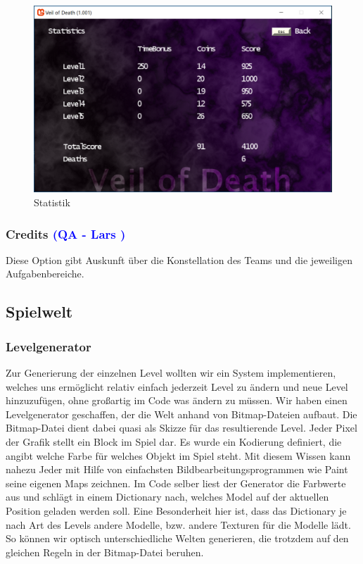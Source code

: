 \documentclass[12pt]{article}
\begin{document}
\begin{figure}
	\centering
	\includegraphics[width=1\textwidth]{Statistics}
	\caption{Statistik
		\label{fig:statistics}}
\end{figure}

\vspace{1cm}
\subsubsection{Credits \textcolor{blue}{(QA - Lars )}}

Diese Option gibt Auskunft über die Konstellation des Teams und die jeweiligen Aufgabenbereiche.

\vspace{2cm}
\subsection{Spielwelt}

\vspace{1cm}
\subsubsection{Levelgenerator}
Zur Generierung der einzelnen Level wollten wir ein System implementieren, welches uns ermöglicht relativ einfach jederzeit Level zu ändern und neue Level hinzuzufügen, ohne großartig im Code was ändern zu müssen.
Wir haben einen Levelgenerator geschaffen, der die Welt anhand von Bitmap-Dateien aufbaut. Die Bitmap-Datei dient dabei quasi als Skizze für das resultierende Level. Jeder Pixel der Grafik stellt ein Block im Spiel dar.
Es wurde ein Kodierung definiert, die angibt welche Farbe für welches Objekt im Spiel steht. Mit diesem Wissen kann nahezu Jeder mit Hilfe von einfachsten Bildbearbeitungsprogrammen wie Paint seine eigenen Maps zeichnen. \newline
Im Code selber liest der Generator die Farbwerte aus und schlägt in einem Dictionary nach, welches Model auf der aktuellen Position geladen werden soll.
Eine Besonderheit hier ist, dass das Dictionary je nach Art des Levels andere Modelle, bzw. andere Texturen für die Modelle lädt. So können wir optisch unterschiedliche Welten generieren, die trotzdem auf den gleichen Regeln in der Bitmap-Datei beruhen.
\end{document}
